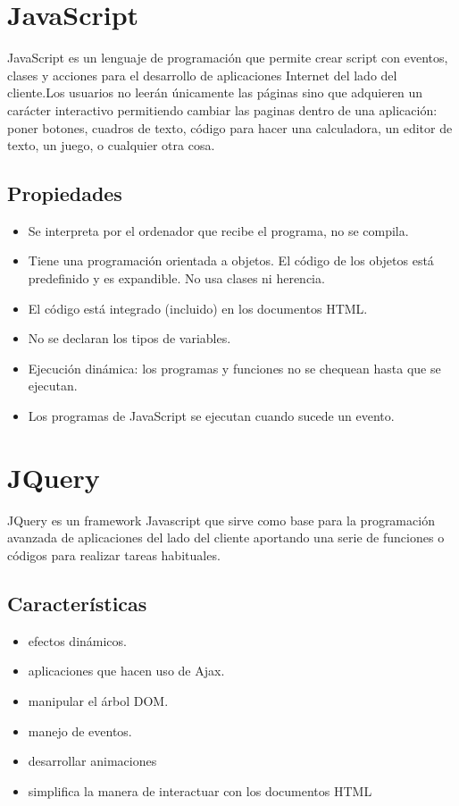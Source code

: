 \section{JavaScript}
JavaScript\cite{javascript} es un lenguaje de programación que permite crear script con eventos, clases y acciones para el desarrollo de aplicaciones Internet del lado del cliente.Los usuarios no leerán únicamente las páginas sino que adquieren un carácter interactivo permitiendo cambiar las paginas dentro de una aplicación: poner botones, cuadros de texto, código para hacer una calculadora, un editor de texto, un juego, o cualquier otra cosa.
\subsection{Propiedades}
\begin{itemize}
\item Se interpreta por el ordenador que recibe el programa, no se compila.
\item Tiene una programación orientada a objetos. El código de los objetos está predefinido y es expandible. No usa clases ni herencia.
\item El código está integrado (incluido) en los documentos HTML.
\item No se declaran los tipos de variables.
\item Ejecución dinámica: los programas y funciones no se chequean hasta que se ejecutan.
\item Los programas de JavaScript se ejecutan cuando sucede un evento. 
\end{itemize}
\section{JQuery}
JQuery\cite{jquery}\cite{jqueryOficial} es un framework Javascript que sirve como base para la programación avanzada  de aplicaciones del lado del cliente aportando una serie de funciones o códigos para realizar tareas habituales.
\subsection{Características}
\begin{itemize}
\item efectos dinámicos.
\item aplicaciones que hacen uso de Ajax.
\item manipular el árbol DOM.
\item manejo de eventos.
\item desarrollar animaciones
\item simplifica la manera de interactuar con los documentos HTML
\end{itemize}
